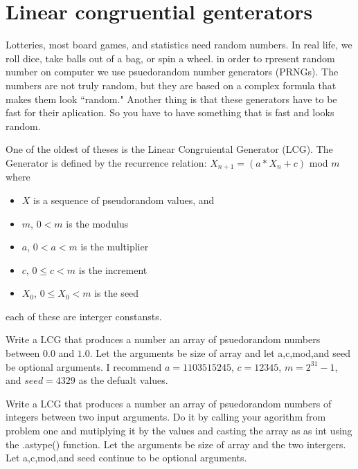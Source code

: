\label{Ch:PRNG}


\section*{Linear congruential genterators}


Lotteries, most board games, and statistics need random numbers. In real life, we roll dice, take balls out of a bag, or spin a wheel. in order to rpresent random number on computer we use  psuedorandom number generators (PRNGs). The numbers are not truly random, but they are based on a complex formula that makes them look ``random." Another thing is that these generators have to be fast for their aplication. So you have to have something that is fast and looks random.

One of the oldest of theses is the Linear Congruiental Generator (LCG). The Generator is defined by the recurrence relation:
$X_{n+1}=(a*X_n + c)$ mod $m$ where

\begin{itemize}
\item[] $X$ is a sequence of pseudorandom values, and
\item[] $m$, $0<m$ is the modulus
\item[] $a$, $0<a<m$ is the multiplier
\item[] $c$, $0\leq c<m$ is the increment
\item[] $X_0$, $0\leq X_0 <m$ is the seed
\end{itemize}


each of these are interger constansts.



\begin{problem}
Write a LCG that produces a number an array of psuedorandom numbers between $0.0$ and $1.0$. Let the arguments be size of array and let a,c,mod,and seed be optional arguments. I recommend $a=1103515245$, $c=12345$, $m=2^{31}-1$, and $seed=4329$ as the defualt values.
\end{problem}

\begin{problem}
Write a LCG that produces a number an array of psuedorandom numbers of integers between two input arguments. Do it by calling your agorithm from problem one and mutiplying it by the values and casting the array as as int using the .astype() function. Let the arguments be size of array and the two intergers. Let a,c,mod,and seed continue to be optional arguments.
\end{problem}

